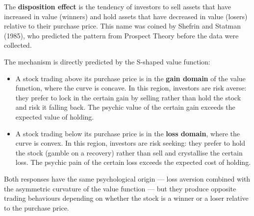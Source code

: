 \documentclass[12pt, letterpaper]{article}
\begin{document}
The \textbf{disposition effect} is the tendency of investors to sell assets that have increased in value (winners) and hold assets that have decreased in value (losers) relative to their purchase price. This name was coined by Shefrin and Statman (1985), who predicted the pattern from Prospect Theory before the data were collected.

The mechanism is directly predicted by the S-shaped value function:
\begin{itemize}
\item A stock trading above its purchase price is in the \textbf{gain domain} of the value function, where the curve is concave. In this region, investors are risk averse: they prefer to lock in the certain gain by selling rather than hold the stock and risk it falling back. The psychic value of the certain gain exceeds the expected value of holding.
\item A stock trading below its purchase price is in the \textbf{loss domain}, where the curve is convex. In this region, investors are risk seeking: they prefer to hold the stock (gamble on a recovery) rather than sell and crystallise the certain loss. The psychic pain of the certain loss exceeds the expected cost of holding.
\end{itemize}

Both responses have the same psychological origin --- loss aversion combined with the asymmetric curvature of the value function --- but they produce opposite trading behaviours depending on whether the stock is a winner or a loser relative to the purchase price.
\end{document}
